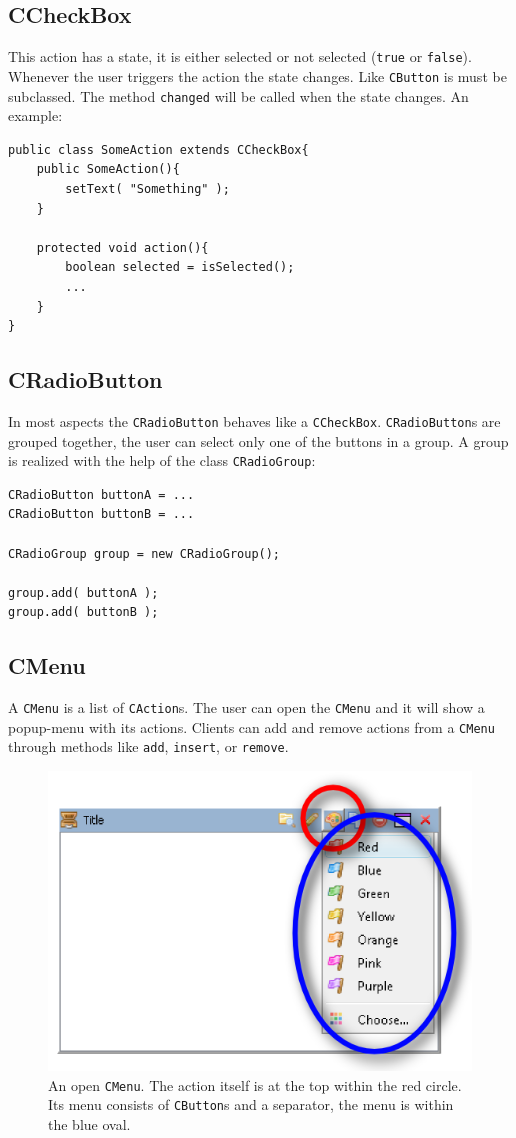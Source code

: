 \documentclass[a4paper,10pt]{article}
\newcommand{\src}[1]{\texttt{#1}}
\begin{document}
\subsection{CCheckBox}
This action has a state, it is either selected or not selected (\src{true} or \src{false}). Whenever the user triggers the action the state changes. Like \src{CButton} is must be subclassed. The method \src{changed} will be called when the state changes. An example:
\begin{lstlisting}
public class SomeAction extends CCheckBox{
	public SomeAction(){
		setText( "Something" );
	}
	
	protected void action(){
		boolean selected = isSelected();
		...
	}
}
\end{lstlisting}

\subsection{CRadioButton}
In most aspects the \src{CRadioButton} behaves like a \src{CCheckBox}. \src{CRadioButton}s are grouped together, the user can select only one of the buttons in a group. A group is realized with the help of the class \src{CRadioGroup}:
\begin{lstlisting}
CRadioButton buttonA = ...
CRadioButton buttonB = ...

CRadioGroup group = new CRadioGroup();

group.add( buttonA );
group.add( buttonB );
\end{lstlisting}

\subsection{CMenu}
A \src{CMenu} is a list of \src{CAction}s. The user can open the \src{CMenu} and it will show a popup-menu with its actions. Clients can add and remove actions from a \src{CMenu} through methods like \src{add}, \src{insert}, or \src{remove}.

\begin{figure}[ht]
\centering
\includegraphics[scale=1]{cmenu}
\caption{An open \src{CMenu}. The action itself is at the top within the red circle. Its menu consists of \src{CButton}s and a separator, the menu is within the blue oval.}
\label{fig:cmenu}
\end{figure}
\end{document}
